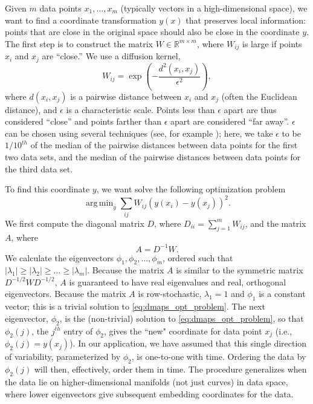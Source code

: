\documentclass[12pt]{article}
\DeclareMathOperator*{\argmin}{arg\,min}
\begin{document}
Given $m$ data points $x_1, \dots, x_m$ (typically vectors in a high-dimensional space), we want to find a coordinate transformation $y(x)$ that preserves local information: points that are close in the original space should also be close in the coordinate $y$.
%
The first step is to construct the matrix $W \in \mathbb{R}^{m \times m}$, where $W_{ij}$ is large if points $x_i$ and $x_j$ are ``close.''
%
We use a diffusion kernel,
\begin{equation} \label{eq:dmaps_W}
W_{ij} = \exp \left( -\frac{d^2(x_i, x_j)}{\epsilon^2} \right),
\end{equation}
where $d(x_i, x_j)$ is a pairwise distance between $x_i$ and $x_j$ (often the Euclidean distance), and $\epsilon$ is a characteristic scale.
%
Points less than $\epsilon$ apart are thus considered ``close'' and points farther than $\epsilon$ apart are considered ``far away''.
%
$\epsilon$ can be chosen using several techniques (see, for example \cite{coifman2008graph, rohrdanz2011determination}); here, we take $\epsilon$ to be $1/10^{th}$ of the median of the pairwise distances between data points for the first two data sets, and the median of the pairwise distances between data points for the third data set.

To find this coordinate $y$, we want solve the following optimization problem \cite{Belkin2003}
\begin{equation} \label{eq:dmaps_opt_problem}
\argmin_{y} \sum_{ij} W_{ij} (y(x_i) - y(x_j))^2.
\end{equation}
%
We first compute the diagonal matrix $D$, where $D_{ii} = \sum_{j=1}^{m} W_{ij}$, and the matrix $A$, where
\begin{equation} \label{eq:dmaps_A}
A = D^{-1} W.
\end{equation}
%
We calculate the eigenvectors $\phi_1, \phi_2, \dots, \phi_m$, ordered such that $|\lambda_1| \ge |\lambda_2| \ge \dots \ge |\lambda_m|$.
%
Because the matrix $A$ is similar to the symmetric matrix $D^{-1/2} W D^{-1/2}$, $A$ is guaranteed to have real eigenvalues and real, orthogonal eigenvectors.
%
Because the matrix $A$ is row-stochastic, $\lambda_1=1$ and $\phi_1$ is a constant vector; this is a trivial solution to \eqref{eq:dmaps_opt_problem}.
%
%
The next eigenvector, $\phi_2$, is the (non-trivial) solution to \eqref{eq:dmaps_opt_problem}, so that $\phi_2(j)$, the $j^{th}$ entry of $\phi_2$, gives the ``new" coordinate for data point $x_j$ (i.e., $\phi_2(j) = y(x_j)$).
%
In our application, we have assumed that this single direction of variability, parameterized by $\phi_2$, is one-to-one with time.
%
Ordering the data by $\phi_2(j)$ will then, effectively, order them in time.
%
The procedure generalizes when the data lie on higher-dimensional manifolds (not just curves) in data space, where lower eigenvectors give subsequent embedding coordinates for the data. 
\end{document}
